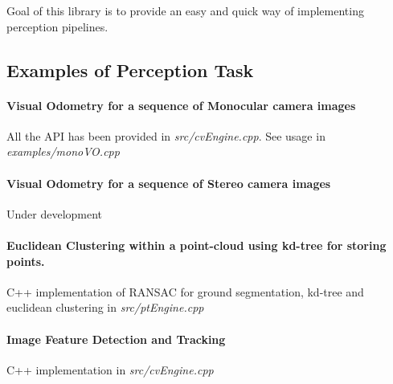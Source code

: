 Goal of this library is to provide an easy and quick way of implementing perception pipelines.



\subsection*{Examples of Perception Task}

\paragraph*{Visual Odometry for a sequence of Monocular camera images}


\begin{DoxyItemize}
\item All the A\+PI has been provided in {\itshape src/cv\+Engine.\+cpp}. See usage in {\itshape examples/mono\+V\+O.\+cpp}
\end{DoxyItemize}



\paragraph*{Visual Odometry for a sequence of Stereo camera images}


\begin{DoxyItemize}
\item Under development
\end{DoxyItemize}

\paragraph*{Euclidean Clustering within a point-\/cloud using kd-\/tree for storing points.}


\begin{DoxyItemize}
\item C++ implementation of R\+A\+N\+S\+AC for ground segmentation, kd-\/tree and euclidean clustering in {\itshape src/pt\+Engine.\+cpp}
\end{DoxyItemize}



\paragraph*{Image Feature Detection and Tracking}


\begin{DoxyItemize}
\item C++ implementation in {\itshape src/cv\+Engine.\+cpp}
\end{DoxyItemize}



